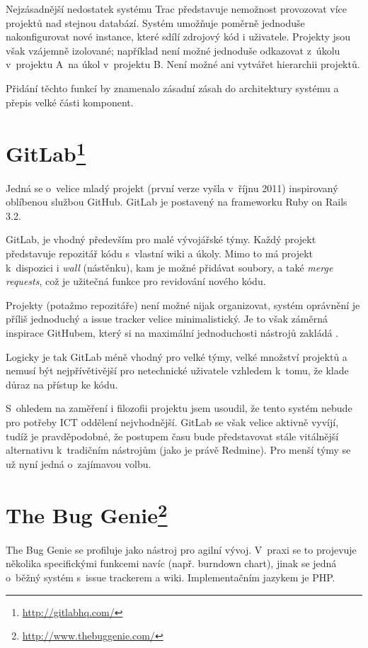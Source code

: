 \documentclass[thesis=B,czech]{FITthesis}[2012/05/02]
\begin{document}
Nejzásadnější nedostatek systému Trac představuje nemožnost provozovat více
projektů nad stejnou databází. Systém umožňuje poměrně jednoduše
nakonfigurovat nové instance, které sdílí zdrojový kód i uživatele.
Projekty jsou však vzájemně izolované; například není možné jednoduše
odkazovat z~úkolu v~projektu A~na úkol v~projektu B. Není
možné ani vytvářet hierarchii projektů.

Přidání těchto funkcí by znamenalo zásadní zásah do architektury systému
a přepis velké části komponent.

\section[GitLab]{GitLab\footnote{\url{http://gitlabhq.com/}}}

Jedná se o~velice mladý projekt (první verze vyšla v~říjnu 2011)
inspirovaný oblíbenou službou GitHub. GitLab je postavený na frameworku
Ruby on Rails 3.2.

GitLab, je vhodný především pro malé vývojářské týmy. Každý projekt
představuje repozitář kódu s~vlastní wiki a úkoly. Mimo to má projekt
k~dispozici i \emph{wall} (nástěnku), kam je možné přidávat soubory, a také
\emph{merge requests}, což je užitečná funkce pro revidování nového kódu.

Projekty (potažmo repozitáře) není možné nijak organizovat,
systém oprávnění je příliš jednoduchý a issue tracker velice
minimalistický. Je to však záměrná inspirace GitHubem, který si na
maximální jednoduchosti nástrojů zakládá \citep[snímky
55-71]{Holman2011}.

Logicky je tak GitLab méně vhodný pro velké týmy, velké množství
projektů a nemusí být nejpřívětivější pro netechnické uživatele vzhledem
k~tomu, že klade důraz na přístup ke kódu.

S~ohledem na zaměření i filozofii projektu jsem usoudil, že tento systém
nebude pro potřeby ICT oddělení nejvhodnější. GitLab se však velice
aktivně vyvíjí, tudíž je pravděpodobné, že postupem času bude
představovat stále vitálnější alternativu k~tradičním nástrojům (jako je
právě Redmine). Pro menší týmy se už nyní jedná o~zajímavou volbu.

\section[The Bug Genie]{The Bug Genie\footnote{\url{http://www.thebuggenie.com/}}}

The Bug Genie se profiluje jako nástroj pro agilní vývoj. V~praxi se to
projevuje několika specifickými funkcemi navíc (např. burndown chart),
jinak se jedná o~běžný systém s~issue trackerem a wiki. Implementačním
jazykem je PHP.
\end{document}
